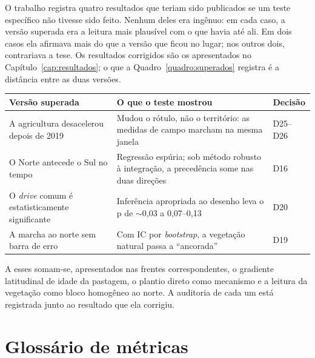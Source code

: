 O trabalho registra quatro resultados que teriam sido publicados
se um teste específico não tivesse sido feito. Nenhum deles era ingênuo: em
cada caso, a versão superada era a leitura mais plausível com o que havia
até ali. Em dois casos ela afirmava mais do que a versão que ficou no lugar;
nos outros dois, contrariava a tese. Os resultados corrigidos são os
apresentados no Capítulo~\ref{cap:resultados}; o que a
Quadro~\ref{quadro:superados} registra é a distância entre as duas versões.

\begin{quadro}[htb]
\centering
\caption[Resultados superados e o teste que os superou]{Resultados superados e o teste que os superou.}
\label{quadro:superados}
\small
\begin{tabular}{p{4.2cm}p{4.6cm}p{4.4cm}}
\toprule
\textbf{Versão superada} & \textbf{O que o teste mostrou} & \textbf{Decisão} \\
\midrule
A agricultura desacelerou depois de 2019 &
Mudou o rótulo, não o território: as medidas de campo marcham na mesma
janela &
D25--D26 \\
\addlinespace
O Norte antecede o Sul no tempo &
Regressão espúria; sob método robusto à integração, a precedência some nas
duas direções &
D16 \\
\addlinespace
O \emph{drive} comum é estatisticamente significante &
Inferência apropriada ao desenho leva o p de $\sim$0,03 a 0,07--0,13 &
D20 \\
\addlinespace
A marcha ao norte sem barra de erro &
Com IC por \emph{bootstrap}, a vegetação natural passa a ``ancorada'' &
D19 \\
\bottomrule
\end{tabular}
\end{quadro}

A esses somam-se, apresentados nas frentes correspondentes, o gradiente
latitudinal de idade da pastagem, o plantio direto como mecanismo e a
leitura da vegetação como bloco homogêneo ao norte. A auditoria de cada um
está registrada junto ao resultado que ela corrigiu.

\chapter{Glossário de métricas}
\label{ap:glossario}

